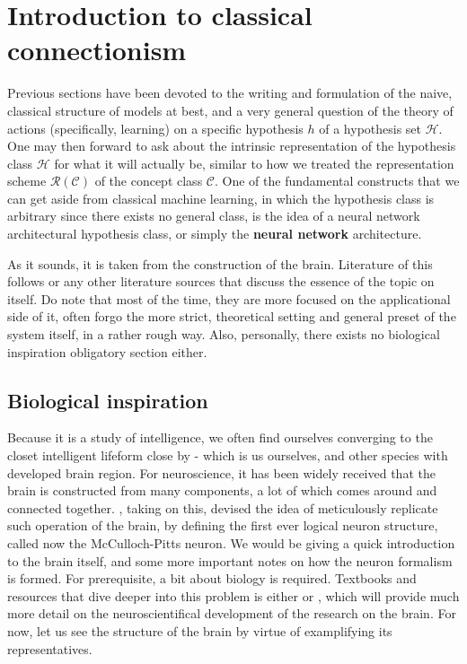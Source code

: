 \chapter{Introduction to classical connectionism}

Previous sections have been devoted to the writing and formulation of the naive, classical structure of models at best, and a very general question of the theory of actions (specifically, learning) on a specific hypothesis $h$ of a hypothesis set $\mathcal{H}$. One may then forward to ask about the intrinsic representation of the hypothesis class $\mathcal{H}$ for what it will actually be, similar to how we treated the representation scheme $\bm{\mathcal{R}}(\mathcal{C})$ of the concept class $\mathcal{C}$. One of the fundamental constructs that we can get aside from classical machine learning, in which the hypothesis class is arbitrary since there exists no general class, is the idea of a neural network architectural hypothesis class, or simply the \textbf{neural network} architecture. 

As it sounds, it is taken from the construction of the brain. Literature of this follows \cite{zhang2023divedeeplearning,10.5555/2721661} or any other literature sources that discuss the essence of the topic on itself. Do note that most of the time, they are more focused on the applicational side of it, often forgo the more strict, theoretical setting and general preset of the system itself, in a rather rough way. Also, personally, there exists no biological inspiration obligatory section either. 

\section{Biological inspiration}

Because it is a study of intelligence, we often find ourselves converging to the closet intelligent lifeform close by - which is us ourselves, and other species with developed brain region. For neuroscience, it has been widely received that the brain is constructed from many components, a lot of which comes around and connected together. \cite{mcculloch_logical_1943}, taking on this, devised the idea of meticulously replicate such operation of the brain, by defining the first ever logical neuron structure, called now the McCulloch-Pitts neuron. We would be giving a quick introduction to the brain itself, and some more important notes on how the neuron formalism is formed. For prerequisite, a bit about biology is required. Textbooks and resources that dive deeper into this problem is either \cite{1180370208} or \cite{purves_neuroscience_2004}, which will provide much more detail on the neuroscientifical development of the research on the brain. For now, let us see the structure of the brain by virtue of examplifying its representatives.

